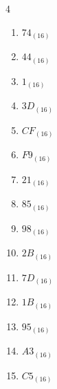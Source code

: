 \begin{multicols}{4}
\begin{enumerate}
        \phantom{$=131$}

  \item $74_{(16)}$

        \phantom{$=116$}

  \item $44_{(16)}$

        \phantom{$=68$}

  \item $1_{(16)}$

        \phantom{$=1$}

  \item $3D_{(16)}$

        \phantom{$=61$}

  \item $CF_{(16)}$

        \phantom{$=207$}

  \item $F9_{(16)}$

        \phantom{$=249$}

\columnbreak %

\resetques

  \item $21_{(16)}$

        \phantom{$=33$}

  \item $85_{(16)}$

        \phantom{$=133$}

  \item $98_{(16)}$

        \phantom{$=152$}

  \item $2B_{(16)}$

        \phantom{$=43$}

  \item $7D_{(16)}$

        \phantom{$=125$}

  \item $1B_{(16)}$

        \phantom{$=27$}

  \item $95_{(16)}$

        \phantom{$=149$}

  \item $A3_{(16)}$

        \phantom{$=163$}

  \item $C5_{(16)}$


\end{enumerate}
\end{multicols}
